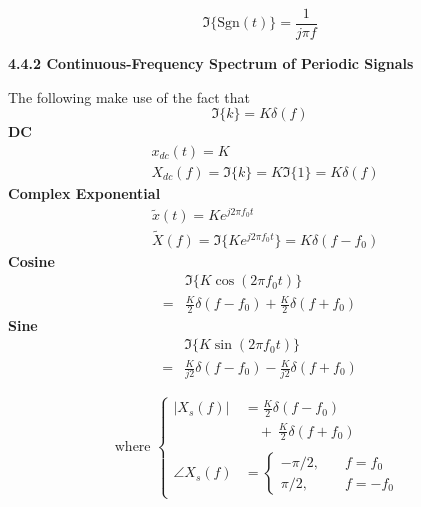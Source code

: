 \documentclass[landscape,a4paper]{extarticle}
\newenvironment{Figure}
  {\noindent\minipage{\linewidth}}
  {\endminipage\par\medskip}
\begin{document}
\begin{multicols*}{5}
    \[
        \Im\{\text{Sgn}(t)\} = \frac{1}{j\pi f}
    \]

    \textbf{4.4.2 Continuous-Frequency Spectrum of Periodic Signals}

    The following make use of the fact that
    \[
        \Im\{k\}=K\delta(f) \tag{4.14}
    \]
    \textbf{DC}
    \begin{align*}
        &x_{dc}(t)=K \\
        &X_{dc}(f)=\Im\{k\}=K\Im\{1\}=K\delta(f)
    \end{align*}
    \textbf{Complex Exponential}
    \begin{align*}
        &\tilde{x}(t) = Ke^{j2\pi f_0t} \\
        &\tilde{X}(f)=\Im\{Ke^{j2\pi f_0t}\} = K\delta(f-f_0)
    \end{align*}
    \textbf{Cosine}
    \begin{align*}
        &\Im\{K\cos{(2\pi f_0t)}\}\\
        =&\frac{K}{2}\delta(f-f_0)+\frac{K}{2}\delta(f+f_0)
    \end{align*}
    \textbf{Sine}
    \begin{align*}
        &\Im\{K\sin(2\pi f_0 t)\}\\
        = &\frac{K}{j2}\delta(f-f_0) - \frac{K}{j2}\delta(f+f_0)
    \end{align*}

    \[
    \text{where } \begin{cases}
            |X_s(f)|&=\frac{K}{2}\delta(f-f_0)\\
            &\quad+ \ \frac{K}{2}\delta(f+f_0)\\\\
            \angle X_s(f)&= \begin{cases}
                -\pi/2, &\quad f=f_0\\
                \pi/2, &\quad f=-f_0
            \end{cases}
        \end{cases}
    \]


\end{multicols*}
\end{document}
